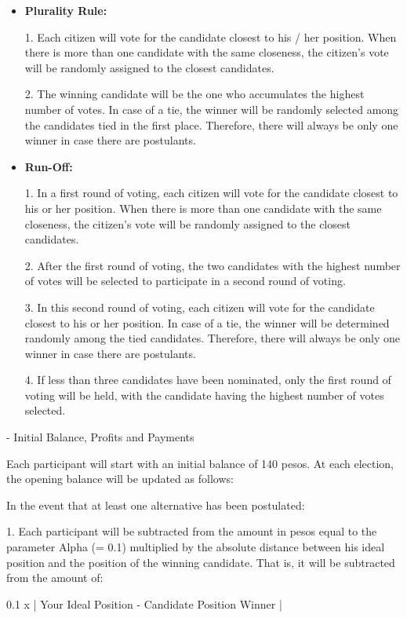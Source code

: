 \begin{itemize}
	\item \textbf{Plurality Rule:}
	
	1. Each citizen will vote for the candidate closest to his / her position. When there is more than one candidate with the same closeness, the citizen's vote will be randomly assigned to the closest candidates.
	
	2. The winning candidate will be the one who accumulates the highest number of votes. In case of a tie, the winner will be randomly selected among the candidates tied in the first place. Therefore, there will always be only one winner in case there are postulants.
	
	\item \textbf{Run-Off:}
	
	1. In a first round of voting, each citizen will vote for the candidate closest to his or her position. When there is more than one candidate with the same closeness, the citizen's vote will be randomly assigned to the closest candidates.
	
	2. After the first round of voting, the two candidates with the highest number of votes will be selected to participate in a second round of voting.
	
	3. In this second round of voting, each citizen will vote for the candidate closest to his or her position. In case of a tie, the winner will be determined randomly among the tied candidates. Therefore, there will always be only one winner in case there are postulants.
	
	4. If less than three candidates have been nominated, only the first round of voting will be held, with the candidate having the highest number of votes selected.
	
\end{itemize}


- Initial Balance, Profits and Payments

Each participant will start with an initial balance of 140 pesos. At each election, the opening balance will be updated as follows:

In the event that at least one alternative has been postulated:

1. Each participant will be subtracted from the amount in pesos equal to the parameter Alpha (= 0.1) multiplied by the absolute distance between his ideal position and the position of the winning candidate. That is, it will be subtracted from the amount of:

0.1 x | Your Ideal Position - Candidate Position Winner |

